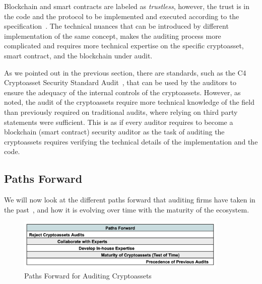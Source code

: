 Blockchain and smart contracts are labeled as \textit{trustless}, however, the trust is in the code and the protocol to be implemented and executed according to the specification~\cite{gaggioli2019middleman}. The technical nuances that can be introduced by different implementation of the same concept, makes the auditing process more complicated and requires more technical expertise on the specific cryptoasset, smart contract, and the blockchain under audit.

As we pointed out in the previous section, there are standards, such as the C4 Cryptoasset Security Standard Audit~\cite{c4ccssa}, that can be used by the auditors to ensure the adequacy of the internal controls of the cryptoassets. However, as noted, the audit of the cryptoassets require more technical knowledge of the field than previously required on traditional audits, where relying on third party statements were sufficient. This is as if every auditor requires to become a blockchain (smart contract) security auditor as the task of auditing the cryptoassets requires verifying the technical details of the implementation and the code.

\subsection{Paths Forward} 

We will now look at the different paths forward that auditing firms have taken in the past~\cite{pimentel2020blockchain,garanina2022blockchain}, and how it is evolving over time with the maturity of the ecosystem.

\begin{figure}[t]\label{fig:pathsforward}
    \centering
    \includegraphics[width=0.9\textwidth]{figures/audit_pathsforward.png}
    \caption[Paths Forward for Auditing Cryptoassets]{Paths Forward for Auditing Cryptoassets}
\end{figure}	


